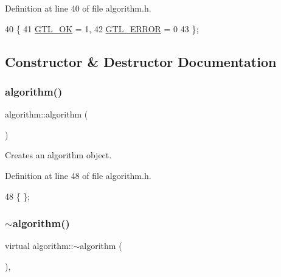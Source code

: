 Definition at line 40 of file algorithm.\+h.


\begin{DoxyCode}
40          \{
41     \mbox{\hyperlink{classalgorithm_af1a0078e153aa99c24f9bdf0d97f6710a5114c20e4a96a76b5de9f28bf15e282b}{GTL\_OK}} = 1,
42     \mbox{\hyperlink{classalgorithm_af1a0078e153aa99c24f9bdf0d97f6710a6fcf574690bbd6cf710837a169510dd7}{GTL\_ERROR}} = 0
43     \};
\end{DoxyCode}


\subsection{Constructor \& Destructor Documentation}
\mbox{\label{classalgorithm_ab79e1ddec2f2afdf4b36b10724db8b15}} 
\subsubsection{\texorpdfstring{algorithm()}{algorithm()}}
{\footnotesize\ttfamily algorithm\+::algorithm (\begin{DoxyParamCaption}{ }\end{DoxyParamCaption})\hspace{0.3cm}{\ttfamily [inline]}}



Creates an algorithm object. 



Definition at line 48 of file algorithm.\+h.


\begin{DoxyCode}
48 \{ \};
\end{DoxyCode}
\mbox{\label{classalgorithm_adca9b1e7fa3afd914519a9dbb44e9fd5}} 
\subsubsection{\texorpdfstring{$\sim$algorithm()}{~algorithm()}}
{\footnotesize\ttfamily virtual algorithm\+::$\sim$algorithm (\begin{DoxyParamCaption}{ }\end{DoxyParamCaption})\hspace{0.3cm}{\ttfamily [inline]}, {\ttfamily [virtual]}}



